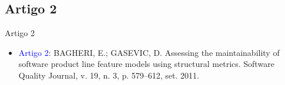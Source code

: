 \subsection{Artigo 2}
\begin{frame}[t, fragile]{Artigo 2}
  \begin{itemize}
    \item \textcolor{Blue}{Artigo 2}: BAGHERI, E.; GASEVIC, D. Assessing the maintainability of software product line feature models using structural metrics. 
    Software Quality Journal, v. 19, n. 3, p. 579–612, set. 2011. 
  \end{itemize}
\end{frame}